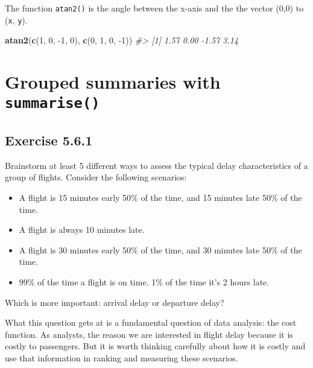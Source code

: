 \documentclass[]{book}
\newenvironment{Shaded}{\begin{snugshade}}{\end{snugshade}}
\newcommand{\CommentTok}[1]{\textcolor[rgb]{0.56,0.35,0.01}{\textit{#1}}}
\newcommand{\DecValTok}[1]{\textcolor[rgb]{0.00,0.00,0.81}{#1}}
\newcommand{\KeywordTok}[1]{\textcolor[rgb]{0.13,0.29,0.53}{\textbf{#1}}}
\newcommand{\NormalTok}[1]{#1}
\providecommand{\tightlist}{%
  \setlength{\itemsep}{0pt}\setlength{\parskip}{0pt}}
\theoremstyle{plain}
\theoremstyle{remark}
\theoremstyle{definition}
\theoremstyle{definition}
\theoremstyle{definition}
\theoremstyle{remark}
\begin{document}
The function \texttt{atan2()} is the angle between the x-axis and the
the vector (0,0) to (\texttt{x}, \texttt{y}).

\begin{Shaded}
\begin{Highlighting}[]
\KeywordTok{atan2}\NormalTok{(}\KeywordTok{c}\NormalTok{(}\DecValTok{1}\NormalTok{, }\DecValTok{0}\NormalTok{, }\DecValTok{-1}\NormalTok{, }\DecValTok{0}\NormalTok{), }\KeywordTok{c}\NormalTok{(}\DecValTok{0}\NormalTok{, }\DecValTok{1}\NormalTok{, }\DecValTok{0}\NormalTok{, }\DecValTok{-1}\NormalTok{))}
\CommentTok{#> [1]  1.57  0.00 -1.57  3.14}
\end{Highlighting}
\end{Shaded}

\hypertarget{grouped-summaries-with-summarise}{%
\section{\texorpdfstring{Grouped summaries with
\texttt{summarise()}}{Grouped summaries with summarise()}}\label{grouped-summaries-with-summarise}}

\hypertarget{exercise-5.6.1}{%
\subsection*{\texorpdfstring{Exercise
{5.6.1}}{Exercise 5.6.1}}\label{exercise-5.6.1}}

Brainstorm at least 5 different ways to assess the typical delay
characteristics of a group of flights. Consider the following scenarios:

\begin{itemize}
\tightlist
\item
  A flight is 15 minutes early 50\% of the time, and 15 minutes late
  50\% of the time.
\item
  A flight is always 10 minutes late.
\item
  A flight is 30 minutes early 50\% of the time, and 30 minutes late
  50\% of the time.
\item
  99\% of the time a flight is on time. 1\% of the time it's 2 hours
  late.
\end{itemize}

Which is more important: arrival delay or departure delay?

What this question gets at is a fundamental question of data analysis:
the cost function. As analysts, the reason we are interested in flight
delay because it is costly to passengers. But it is worth thinking
carefully about how it is costly and use that information in ranking and
measuring these scenarios.
\end{document}
